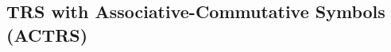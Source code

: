

\subsection{TRS with Associative-Commutative Symbols (ACTRS)}

\begin{definition}[Match]
\end{definition}

\begin{definition}[witness]
\end{definition}

\begin{definition}[ACTRS]
\end{definition}

